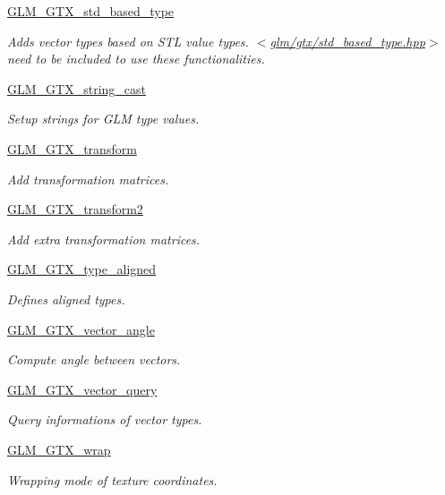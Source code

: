 \begin{DoxyCompactItemize}
\hyperlink{group__gtx__std__based__type}{G\-L\-M\-\_\-\-G\-T\-X\-\_\-std\-\_\-based\-\_\-type}
\begin{DoxyCompactList}\small\item\em Adds vector types based on S\-T\-L value types. $<$\hyperlink{std__based__type_8hpp}{glm/gtx/std\-\_\-based\-\_\-type.\-hpp}$>$ need to be included to use these functionalities. \end{DoxyCompactList}\item 
\hyperlink{group__gtx__string__cast}{G\-L\-M\-\_\-\-G\-T\-X\-\_\-string\-\_\-cast}
\begin{DoxyCompactList}\small\item\em Setup strings for G\-L\-M type values. \end{DoxyCompactList}\item 
\hyperlink{group__gtx__transform}{G\-L\-M\-\_\-\-G\-T\-X\-\_\-transform}
\begin{DoxyCompactList}\small\item\em Add transformation matrices. \end{DoxyCompactList}\item 
\hyperlink{group__gtx__transform2}{G\-L\-M\-\_\-\-G\-T\-X\-\_\-transform2}
\begin{DoxyCompactList}\small\item\em Add extra transformation matrices. \end{DoxyCompactList}\item 
\hyperlink{group__gtx__type__aligned}{G\-L\-M\-\_\-\-G\-T\-X\-\_\-type\-\_\-aligned}
\begin{DoxyCompactList}\small\item\em Defines aligned types. \end{DoxyCompactList}\item 
\hyperlink{group__gtx__vector__angle}{G\-L\-M\-\_\-\-G\-T\-X\-\_\-vector\-\_\-angle}
\begin{DoxyCompactList}\small\item\em Compute angle between vectors. \end{DoxyCompactList}\item 
\hyperlink{group__gtx__vector__query}{G\-L\-M\-\_\-\-G\-T\-X\-\_\-vector\-\_\-query}
\begin{DoxyCompactList}\small\item\em Query informations of vector types. \end{DoxyCompactList}\item 
\hyperlink{group__gtx__wrap}{G\-L\-M\-\_\-\-G\-T\-X\-\_\-wrap}
\begin{DoxyCompactList}\small\item\em Wrapping mode of texture coordinates. \end{DoxyCompactList}\end{DoxyCompactItemize}


